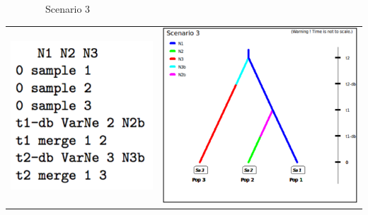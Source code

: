 \medskip \ \ \ \ \ \ \ \  Scenario 3
\begin{center} 
\begin{tabular}{cc}
\includegraphics[scale=0.5]{code_scenario_05-3.pdf} & \includegraphics[scale=0.4]{test3pop_scenario_3.pdf} \\
\end{tabular}
\end{center}


